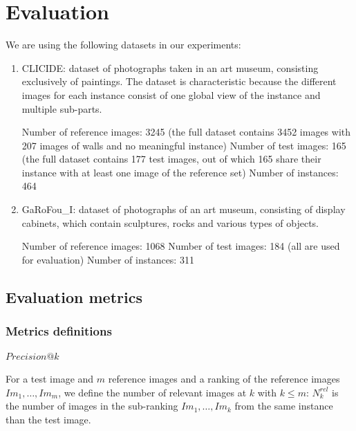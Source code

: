 \documentclass[fleqn]{article}
\begin{document}
\section{Evaluation}\label{sec:eval}
We are using the following datasets in our experiments:
\begin{enumerate}
    \item CLICIDE: dataset of photographs taken in an art museum,
    consisting exclusively of paintings. The dataset is characteristic
    because the different images for each instance consist of one
    global view of the instance and multiple sub-parts.

    Number of reference images: 3245 (the full dataset contains
    3452 images with 207 images of walls and no meaningful instance)
    Number of test images: 165 (the full dataset contains 177
    test images, out of which 165 share their instance with
    at least one image of the reference set)
    Number of instances: 464
    \item GaRoFou\_I: dataset of photographs of an art museum,
    consisting of display cabinets, which contain sculptures,
    rocks and various types of objects.

    Number of reference images: 1068
    Number of test images: 184 (all are used for evaluation)
    Number of instances: 311


\end{enumerate}

\subsection{Evaluation metrics}
\subsubsection{Metrics definitions}
\paragraph{$Precision@k$}
For a test image and $m$ reference images and a ranking of the
reference images $Im_1, \dots, Im_m$, we define the number of relevant
images at $k$ with $k \leq m$:
$N^{rel}_k$ is the number of images in the sub-ranking
$Im_1, \dots, Im_k$ from the same instance than the test image.
\end{document}
